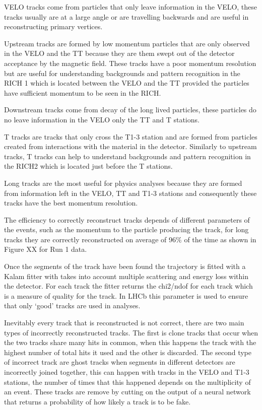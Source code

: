 VELO tracks come from particles that only leave information in the VELO, these tracks usually are at a large angle or are travelling backwards and are useful in reconstructing primary vertices.

Upstream tracks are formed by low momentum particles that are only observed in the VELO and the TT because they are them swept out of the detector acceptance by the magnetic field. These tracks have a poor momentum resolution but are useful for understanding backgrounds and pattern recognition in the RICH 1 which is located between the VELO and the TT provided the particles have sufficient momentum to be seen in the RICH.

Downstream tracks come from decay of the long lived particles, these particles do no leave information in the VELO only the TT and T stations. 

T tracks are tracks that only cross the T1-3 station and are formed from particles created from interactions with the material in the detector. Similarly to upstream tracks, T tracks can help to understand backgrounds and pattern recognition in the RICH2 which is located just before the T stations.

Long tracks are the most useful for physics analyses because they are formed from information left in the VELO, TT and T1-3 stations and consequently these tracks have the best momentum resolution.

The efficiency to correctly reconstruct tracks depends of different parameters of the events, such as the momentum to the particle producing the track, for long tracks they are correctly reconstructed on average of 96$\%$ of the time as shown in Figure XX for Run 1 data. 


Once the segments of the track have been found the trajectory is fitted with a Kalam fitter with takes into account multiple scattering and energy loss within the detector. For each track the fitter returns the chi2/ndof for each track which is a measure of quality for the track. In LHCb this parameter is used to ensure that only ‘good’ tracks are used in analyses. 

Inevitably every track that is reconstructed is not correct, there are two main types of incorrectly reconstructed tracks. The first is clone tracks that occur when the two tracks share many hits in common, when this happens the track with the highest number of total hits it used and the other is discarded. The second type of incorrect track are ghost tracks when segments in different detectors are incorrectly joined together, this can happen with tracks in the VELO and T1-3 stations, the number of times that this happened depends on the multiplicity of an event. These tracks are remove by cutting on the output of a neural network that returns a probability of how likely a track is to be fake.




